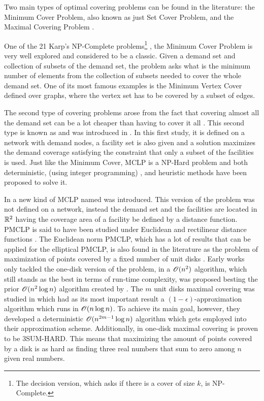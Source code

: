 Two main types of optimal covering problems can be found in the literature: the Minimum Cover Problem, also known as just Set Cover Problem, and the Maximal Covering Problem \cite{karatas}. 

One of the 21 Karp's NP-Complete problems\footnote{The decision version, which asks if there is a cover of size $k$, is NP-Complete.} \cite{karp}, the Minimum Cover Problem is very well explored and considered to be a classic. 
Given a demand set and collection of subsets of the demand set, the problem asks what is the minimum number of elements from the collection of subsets needed to cover the whole demand set. One of its most famous examples is the Minimum Vertex Cover defined over graphs, where the vertex set has to be covered by a subset of edges.

The second type of covering problems arose from the fact that covering almost all the demand set can be a lot cheaper than having to cover it all \cite{garcia}. This second type is known as  and was introduced in \cite{church:1974}. In this first study, it is defined on a network with demand nodes, a facility set is also given and a solution maximizes the demand coverage satisfying the constraint that only a subset of the facilities is used. Just like the Minimum Cover, MCLP is a NP-Hard problem \cite{hatta:2013} and both deterministic, (using integer programming) \cite{church:1974}, and heuristic methods \cite{revelle:2008} have been proposed to solve it.

In \cite{church:1984} a new kind of MCLP named  was introduced. This version of the problem was not defined on a network, instead the demand set and the facilities are located in $\mathbb{R}^2$ having the coverage area of a facility be defined by a distance function. PMCLP is said to have been studied under Euclidean and rectilinear distance functions \cite{younies}. The Euclidean norm PMCLP, which has a lot of results that can be applied for the elliptical PMCLP, is also found in the literature as the problem of maximization of points covered by a fixed number of unit disks \cite{cabello:2006}. 
Early works only tackled the one-disk version of the problem, in \cite{chazelle:1986} a $\mathscr{O}(n^2)$ algorithm, which still stands as the best in terms of run-time complexity, was proposed besting the prior $\mathscr{O}(n^2\log{n})$ algorithm created by \cite{drezner}.
The $m$ unit disks maximal covering was studied in \cite{cabello:2006} which had as its most important result a $(1-\epsilon)$-approximation algorithm which runs in $\mathscr{O}(n\log{n})$. To achieve its main goal, however, they developed a deterministic $\mathscr{O}(n^{2m-1}\log{n})$ algorithm which gets employed into their approximation scheme.
Additionally, in \cite{aronov:2008} one-disk maximal covering is proven to be 3SUM-HARD. This means that maximizing the amount of points covered by a disk is as hard as finding three real numbers that sum to zero among $n$ given real numbers.

